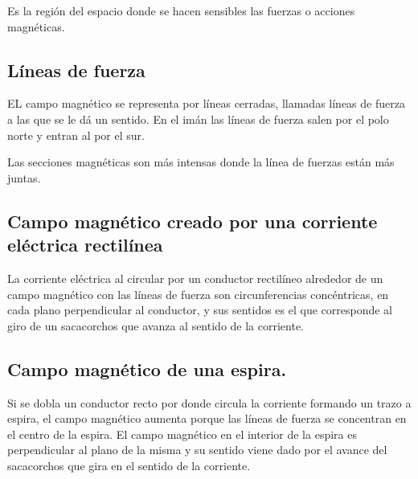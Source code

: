 Es la región del espacio donde se hacen sensibles las fuerzas o acciones magnéticas.

\subsection{Líneas de fuerza}

EL campo magnético se representa por líneas cerradas, llamadas líneas de fuerza a las que se le dá un sentido. En el imán las líneas de fuerza salen por el polo norte y entran al por el sur.

Las secciones magnéticas son más intensas donde la línea de fuerzas están más juntas.


\begin{center}
\end{center}

\subsection{Campo magnético creado por una corriente eléctrica rectilínea}

La corriente eléctrica al circular por un conductor rectilíneo alrededor de un campo magnético con las líneas de fuerza son circunferencias concéntricas, en cada plano perpendicular al conductor, y sus sentidos es el que corresponde al giro de un sacacorchos que avanza al sentido de la corriente.

\subsection{Campo magnético de una espira.}

Si se dobla un conductor recto por donde circula la corriente formando un trazo a espira, el campo magnético aumenta porque las líneas de fuerza se concentran en el centro de la espira. El campo magnético en el interior de la espira es perpendicular al plano de la misma y su sentido viene dado por el avance del sacacorchos que gira en el sentido de la corriente.

